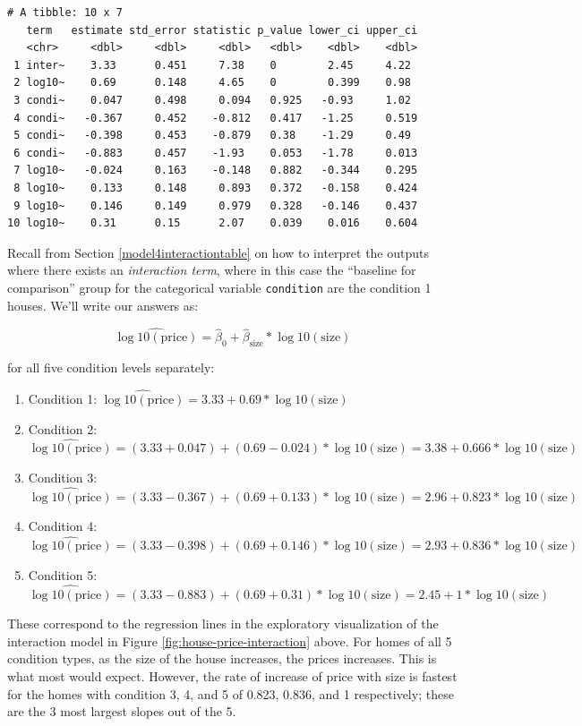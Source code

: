 \documentclass[12pt,]{krantz}
\providecommand{\tightlist}{%
  \setlength{\itemsep}{0pt}\setlength{\parskip}{0pt}}
\theoremstyle{definition}
\theoremstyle{definition}
\theoremstyle{definition}
\theoremstyle{remark}
\begin{document}
\begin{verbatim}
# A tibble: 10 x 7
   term   estimate std_error statistic p_value lower_ci upper_ci
   <chr>     <dbl>     <dbl>     <dbl>   <dbl>    <dbl>    <dbl>
 1 inter~    3.33      0.451     7.38    0        2.45     4.22 
 2 log10~    0.69      0.148     4.65    0        0.399    0.98 
 3 condi~    0.047     0.498     0.094   0.925   -0.93     1.02 
 4 condi~   -0.367     0.452    -0.812   0.417   -1.25     0.519
 5 condi~   -0.398     0.453    -0.879   0.38    -1.29     0.49 
 6 condi~   -0.883     0.457    -1.93    0.053   -1.78     0.013
 7 log10~   -0.024     0.163    -0.148   0.882   -0.344    0.295
 8 log10~    0.133     0.148     0.893   0.372   -0.158    0.424
 9 log10~    0.146     0.149     0.979   0.328   -0.146    0.437
10 log10~    0.31      0.15      2.07    0.039    0.016    0.604
\end{verbatim}

Recall from Section \ref{model4interactiontable} on how to interpret the
outputs where there exists an \emph{interaction term}, where in this
case the ``baseline for comparison'' group for the categorical variable
\texttt{condition} are the condition 1 houses. We'll write our answers
as:

\[\widehat{\log10(\text{price})} = \hat{\beta}_0 + \hat{\beta}_{\text{size}} * \log10(\text{size})\]

for all five condition levels separately:

\begin{enumerate}
\def\labelenumi{\arabic{enumi}.}
\tightlist
\item
  Condition 1:
  \(\widehat{\log10(\text{price})} = 3.33 + 0.69 * \log10(\text{size})\)
\item
  Condition 2:
  \(\widehat{\log10(\text{price})} = (3.33 + 0.047) + (0.69 - 0.024) * \log10(\text{size}) = 3.38 + 0.666 * \log10(\text{size})\)
\item
  Condition 3:
  \(\widehat{\log10(\text{price})} = (3.33 - 0.367) + (0.69 + 0.133) * \log10(\text{size}) = 2.96 + 0.823 * \log10(\text{size})\)
\item
  Condition 4:
  \(\widehat{\log10(\text{price})} = (3.33 - 0.398) + (0.69 + 0.146) * \log10(\text{size}) = 2.93 + 0.836 * \log10(\text{size})\)
\item
  Condition 5:
  \(\widehat{\log10(\text{price})} = (3.33 - 0.883) + (0.69 + 0.31) * \log10(\text{size}) = 2.45 + 1 * \log10(\text{size})\)
\end{enumerate}

These correspond to the regression lines in the exploratory
visualization of the interaction model in Figure
\ref{fig:house-price-interaction} above. For homes of all 5 condition
types, as the size of the house increases, the prices increases. This is
what most would expect. However, the rate of increase of price with size
is fastest for the homes with condition 3, 4, and 5 of 0.823, 0.836, and
1 respectively; these are the 3 most largest slopes out of the 5.
\end{document}
